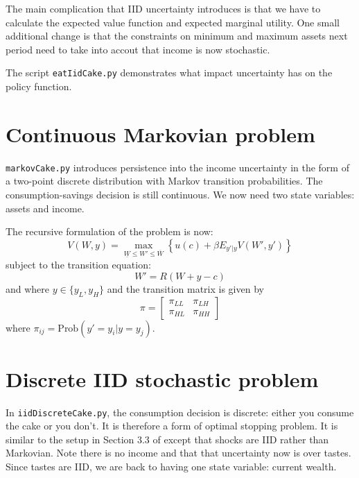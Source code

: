 \documentclass[12pt]{article}
\begin{document}
The main complication that IID uncertainty introduces is that we have to calculate the expected value function and expected marginal utility. One small additional change is that the constraints on minimum and maximum assets next period need to take into accout that income is now stochastic.

The script \texttt{eatIidCake.py} demonstrates what impact uncertainty has on the policy function.

\section{Continuous Markovian problem}

\texttt{markovCake.py} introduces persistence into the income uncertainty in the form of a two-point discrete distribution with Markov transition probabilities. The consumption-savings decision is still continuous. We now need two state variables: assets and income.

The recursive formulation of the problem is now:
\begin{equation}
	V(W, y) = \max_{\underline{W} \leq W' \leq \overline{W}} \left\{ u(c) + \beta E_{y' | y} V(W', y') \right\}
\end{equation}
subject to the transition equation:
\begin{equation}
	W' = R (W + y - c)
\end{equation}
and where \(y \in \{y_L, y_H\}\) and the transition matrix is given by
\begin{equation}
	\pi = 
	\left[
	\begin{matrix}
		\pi_{LL} & \pi_{LH} \\
		\pi_{HL} & \pi_{HH}
	\end{matrix}
	\right]
\end{equation}
where \(\pi_{ij} = \text{Prob}(y' = y_i | y = y_j)\).

\section{Discrete IID stochastic problem}

In \texttt{iidDiscreteCake.py}, the consumption decision is discrete: either you consume the cake or you don't. It is therefore a form of optimal stopping problem. It is similar to the setup in Section 3.3 of \citet{adda2003dynamic} except that shocks are IID rather than Markovian. Note there is no income and that that uncertainty now is over tastes. Since tastes are IID, we are back to having one state variable: current wealth.
\end{document}

